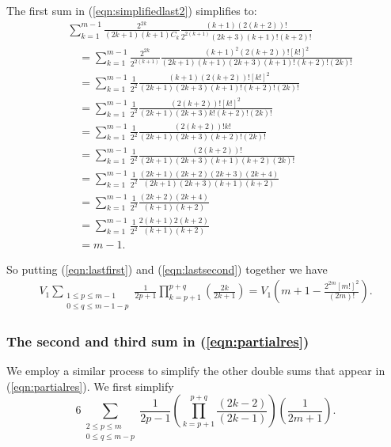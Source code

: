\documentclass[11pt]{article}
\theoremstyle{definition}
\theoremstyle{definition}
\theoremstyle{plain}
\theoremstyle{plain}
\theoremstyle{plain}
\theoremstyle{definition}
\theoremstyle{definition}
\begin{document}
{The first sum in (\ref{eqn:simplifiedlast2}) simplifies to:
\begin{equation}\label{eqn:lastfirst}
\begin{aligned}
&\sum\limits_{k=1}^{m-1}\frac{2^{2k}}{(2k+1)(k+1)C_k}\frac{(k+1)(2(k+2))!}{2^{2(k+1)}(2k+3)(k+1)!(k+2)!} \\
&\quad= \sum\limits_{k=1}^{m-1}\frac{2^{2k}}{2^{2(k+1)}}\frac{(k+1)^2(2(k+2))![k!]^2}{(2k+1)(k+1)(2k+3)(k+1)!(k+2)!(2k)!} \\
&\quad= \sum\limits_{k=1}^{m-1}\frac{1}{2^2}\frac{(k+1)(2(k+2))![k!]^2}{(2k+1)(2k+3)(k+1)!(k+2)!(2k)!} \\
&\quad= \sum\limits_{k=1}^{m-1}\frac{1}{2^2}\frac{(2(k+2))![k!]^2}{(2k+1)(2k+3)k!(k+2)!(2k)!} \\
&\quad= \sum\limits_{k=1}^{m-1}\frac{1}{2^2}\frac{(2(k+2))!k!}{(2k+1)(2k+3)(k+2)!(2k)!} \\
&\quad = \sum\limits_{k=1}^{m-1}\frac{1}{2^2}\frac{(2(k+2))!}{(2k+1)(2k+3)(k+1)(k+2)(2k)!} \\
&\quad = \sum\limits_{k=1}^{m-1}\frac{1}{2^2}\frac{(2k+1)(2k+2)(2k+3)(2k+4)}{(2k+1)(2k+3)(k+1)(k+2)} \\
&\quad = \sum\limits_{k=1}^{m-1}\frac{1}{2^2}\frac{(2k+2)(2k+4)}{(k+1)(k+2)} \\
&\quad = \sum\limits_{k=1}^{m-1}\frac{1}{2^2}\frac{2(k+1)2(k+2)}{(k+1)(k+2)} \\
&\quad = m-1.
\end{aligned}
\end{equation}

So putting (\ref{eqn:lastfirst}) and (\ref{eqn:lastsecond}) together we have
\begin{equation}\label{eqn:lastsimp}
\begin{aligned}
V_1\sum\limits_{\substack{1\leq p \leq m -1 \\ 0 \leq q \leq m-1-p}}\frac{1}{2p+1}\prod\limits_{k=p+1}^{p+q}\left(\frac{2k}{2k+1}\right) = V_1\left(m+1 - \frac{2^{2m}[m!]^2}{(2m)!}\right).
\end{aligned}
\end{equation}

\subsubsection*{The second and third sum in (\ref{eqn:partialres})}

We employ a similar process to simplify the other double sums that appear in (\ref{eqn:partialres}). We first simplify
\begin{equation}\label{eqn:third}
6\sum\limits_{\substack{2 \leq p \leq m \\ 0 \leq q \leq m - p}} \frac{1}{2p-1}\left(\prod\limits_{k=p+1}^{p+q}\frac{(2k-2)}{(2k-1)}\right)\left(\frac{1}{2m+1}\right).
\end{equation}

}
\end{document}
